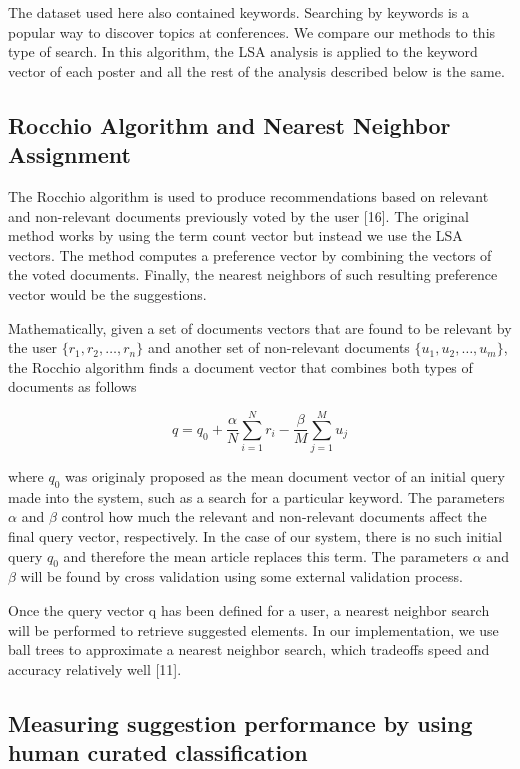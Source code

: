 \documentclass[a4paper]{article}
\begin{document}
The dataset used here also contained keywords. Searching by keywords is a popular way to discover topics at conferences. We compare our methods to this type of search. In this algorithm, the LSA analysis is applied to the keyword vector of each poster and all the rest of the analysis described below is the same.


\subsection{Rocchio Algorithm and Nearest Neighbor Assignment}

The Rocchio algorithm is used to produce recommendations based on relevant and non-relevant documents previously voted by the user [16]. The original method works by using the term count vector but instead we use the LSA vectors. The method computes a preference vector by combining the vectors of the voted documents. Finally, the nearest neighbors of such resulting preference vector would be the suggestions.


Mathematically, given a set of documents vectors that are found to be relevant by the user $\{r_1,r_2,…,r_n\}$ and another set of non-relevant documents $\{u_1,u_2,…,u_m\}$, the Rocchio algorithm finds a document vector that combines both types of documents as follows


\begin{equation}
 q = q_0 + \frac{\alpha}{N} \sum_{i=1}^N r_i - \frac{\beta}{M} \sum_{j=1}^M u_j
\end{equation}

where $q_0$ was originaly proposed as the mean document vector of an initial query made into the system, such as a search for a particular keyword. The parameters $\alpha$ and $\beta$ control how much the relevant and non-relevant documents affect the final query vector, respectively. In the case of our system, there is no such initial query $q_0$ and therefore the mean article replaces this term. The parameters $\alpha$ and $\beta$ will be found by cross validation using some external validation process.


Once the query vector q has been defined for a user, a nearest neighbor search will be performed to retrieve suggested elements. In our implementation, we use ball trees to approximate a nearest neighbor search, which tradeoffs speed and accuracy relatively well [11].

\subsection{Measuring suggestion performance by using human curated classification}
\end{document}
